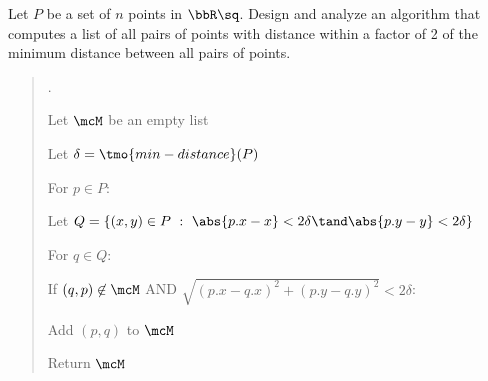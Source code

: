 \documentclass[10pt]{article}
\begin{document}
\setcounter{section}{3}
\setcounter{exercise}{2}
\begin{exercise} %
  Let \( P \) be a set of \( n \) points in \( \bbR\sq \). Design and analyze an algorithm that computes a
  list of all pairs of points with distance within a factor of 2 of the minimum distance between all
  pairs of points.
\end{exercise}

\begin{quote}
.
\begin{steps}
  \item Let \( \mcM \) be an empty list
  \item Let \( \delta = \tmo{min-distance}(P) \)
  \item For \( p \in P \): 
  \begin{steps}
    \item Let \( Q = \{(x,y)\in P\ :\ \abs{p.x-x} < 2\delta \tand \abs{p.y-y} < 2\delta\} \)
    \item For \( q \in Q \): 
    \begin{steps}
      \item If \( (q,p) \not\in \mcM \) AND \( \sqrt{(p.x-q.x)^2 + (p.y-q.y)^2} < 2\delta \):
      \begin{steps}
        \item Add \( (p,q) \) to \( \mcM \)
      \end{steps}
    \end{steps}
  \end{steps}
  \item Return \( \mcM \)
\end{steps}
\end{quote}
\end{document}
